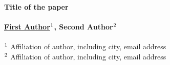 \documentclass[a4paper,10pt]{article}
\begin{document}
\thispagestyle{fancy}
\setlength{\headrulewidth}{0pt}

\begin{center}
\large{\bf{Title of the paper}}\\~\\
\normalsize{\bf{\underline{First Author}$^{\mbox{\scriptsize 1}}$, Second Author$^{\mbox{\scriptsize 2}}$}}
\\~\\
\small{$^{\mbox{\scriptsize 1}}$ Affiliation of author, including city, email address}~\\
\small{$^{\mbox{\scriptsize 2}}$ Affiliation of author, including city, email address}
\end{center}
\end{document}
